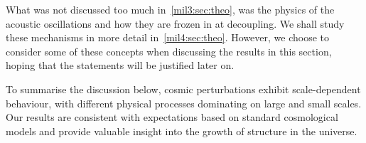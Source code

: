 













What was not discussed too much in~\cref{mil3:sec:theo}, was the physics of the acoustic oscillations and how they are frozen in at decoupling. We shall study these mechanisms in more detail in~\cref{mil4:sec:theo}. However, we choose to consider some of these concepts when discussing the results in this section, hoping that the statements will be justified later on.


To summarise the discussion below, cosmic perturbations exhibit scale-dependent behaviour, with different physical processes dominating on large and small scales. Our results are consistent with expectations based on standard cosmological models and provide valuable insight into the growth of structure in the universe.


